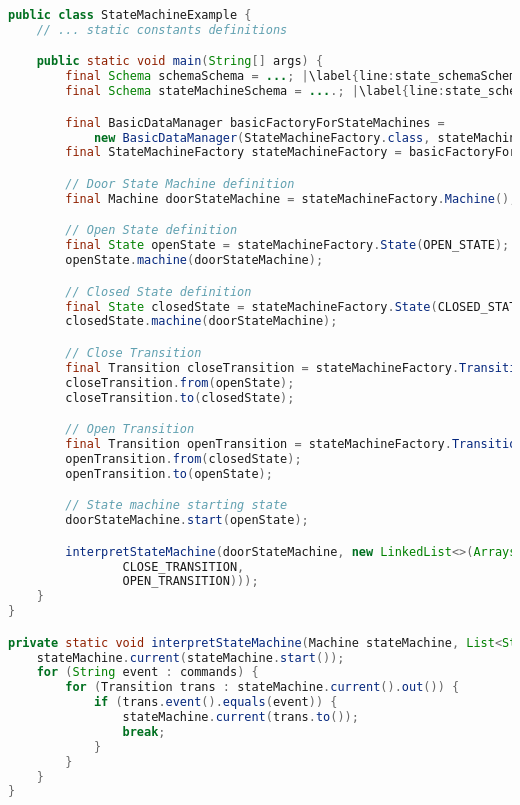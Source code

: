 \begin{sourcecode} [H]
	\begin{lstlisting}[language=Java, escapechar=|]
public class StateMachineExample {
	// ... static constants definitions

	public static void main(String[] args) {
		final Schema schemaSchema = ...; |\label{line:state_schemaSchema}|
		final Schema stateMachineSchema = ....; |\label{line:state_schemaMachineSchema}|

		final BasicDataManager basicFactoryForStateMachines = 
			new BasicDataManager(StateMachineFactory.class, stateMachineSchema);  |\label{line:state_meaning_full_code}|
		final StateMachineFactory stateMachineFactory = basicFactoryForStateMachines.make();

		// Door State Machine definition
		final Machine doorStateMachine = stateMachineFactory.Machine(); |\label{line:state_machine_creation_basic}|

		// Open State definition
		final State openState = stateMachineFactory.State(OPEN_STATE);
		openState.machine(doorStateMachine);

		// Closed State definition
		final State closedState = stateMachineFactory.State(CLOSED_STATE);
		closedState.machine(doorStateMachine);

		// Close Transition
		final Transition closeTransition = stateMachineFactory.Transition(CLOSE_TRANSITION);
		closeTransition.from(openState);
		closeTransition.to(closedState);

		// Open Transition
		final Transition openTransition = stateMachineFactory.Transition(OPEN_TRANSITION);
		openTransition.from(closedState);
		openTransition.to(openState);

		// State machine starting state
		doorStateMachine.start(openState);

		interpretStateMachine(doorStateMachine, new LinkedList<>(Arrays.asList(
		        CLOSE_TRANSITION,
		        OPEN_TRANSITION)));
	}
}

private static void interpretStateMachine(Machine stateMachine, List<String> commands) { |\label{line:state_machine_interpreter}|
    stateMachine.current(stateMachine.start());
    for (String event : commands) {
        for (Transition trans : stateMachine.current().out()) {
            if (trans.event().equals(event)) {
                stateMachine.current(trans.to());
                break;
            }
        }
    }
}   
	\end{lstlisting}
	\caption{Door state machine}
	\label{lst:Door_state_machine}
\end{sourcecode}

